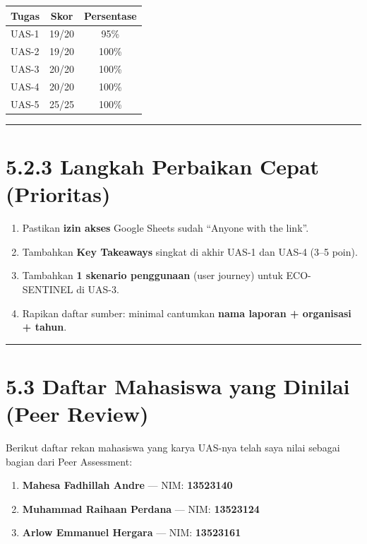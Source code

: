 \documentclass[
  letterpaper,
  DIV=11,
  numbers=noendperiod]{scrreprt}
\providecommand{\tightlist}{%
  \setlength{\itemsep}{0pt}\setlength{\parskip}{0pt}}
\begin{document}
\begin{longtable}[]{@{}lcc@{}}
\toprule\noalign{}
Tugas & Skor & Persentase \\
\midrule\noalign{}
\endhead
\bottomrule\noalign{}
\endlastfoot
UAS-1 & 19/20 & 95\% \\
UAS-2 & 19/20 & 100\% \\
UAS-3 & 20/20 & 100\% \\
UAS-4 & 20/20 & 100\% \\
UAS-5 & 25/25 & 100\% \\
\end{longtable}

\begin{center}\rule{0.5\linewidth}{0.5pt}\end{center}

\section{5.2.3 Langkah Perbaikan Cepat
(Prioritas)}\label{langkah-perbaikan-cepat-prioritas}

\begin{enumerate}
\def\labelenumi{\arabic{enumi}.}
\tightlist
\item
  Pastikan \textbf{izin akses} Google Sheets sudah ``Anyone with the
  link''.\\
\item
  Tambahkan \textbf{Key Takeaways} singkat di akhir UAS-1 dan UAS-4
  (3--5 poin).\\
\item
  Tambahkan \textbf{1 skenario penggunaan} (user journey) untuk
  ECO-SENTINEL di UAS-3.\\
\item
  Rapikan daftar sumber: minimal cantumkan \textbf{nama laporan +
  organisasi + tahun}.
\end{enumerate}

\begin{center}\rule{0.5\linewidth}{0.5pt}\end{center}

\section{5.3 Daftar Mahasiswa yang Dinilai (Peer
Review)}\label{daftar-mahasiswa-yang-dinilai-peer-review}

Berikut daftar rekan mahasiswa yang karya UAS-nya telah saya nilai
sebagai bagian dari Peer Assessment:

\begin{enumerate}
\def\labelenumi{\arabic{enumi}.}
\tightlist
\item
  \textbf{Mahesa Fadhillah Andre} --- NIM: \textbf{13523140}\\
\item
  \textbf{Muhammad Raihaan Perdana} --- NIM: \textbf{13523124}\\
\item
  \textbf{Arlow Emmanuel Hergara} --- NIM: \textbf{13523161}
\end{enumerate}
\end{document}
